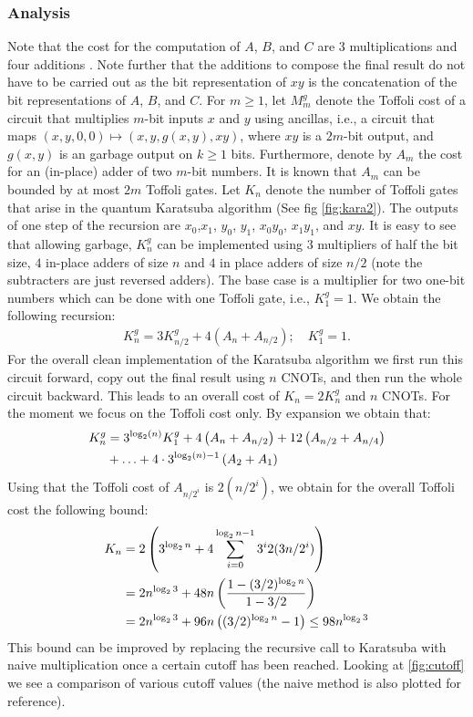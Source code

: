     \subsubsection{Analysis}
      Note that the cost for the computation of $A$, $B$, and $C$ are $3$ multiplications and four additions .
      Note further that the additions to compose the final result do not have to be carried out as the bit representation of $xy$ is the concatenation of the bit representations of $A$, $B$, and $C$.
      For $m\geq 1$, let $M^{g}_m$ denote the Toffoli cost of a circuit that multiplies $m$-bit inputs $x$ and $y$ using ancillas, i.e., a circuit that maps $(x, y, 0, 0) \mapsto (x, y, g(x,y), xy)$, where $xy$ is a $2m$-bit output, and $g(x,y)$ is an garbage output on $k\geq 1$ bits.
      Furthermore, denote by $A_m$ the cost for an (in-place) adder of two $m$-bit numbers.
      It is known that $A_m$ can be bounded by at most $2m$ Toffoli gates. Let $K_n$ denote the number of Toffoli gates that arise in the quantum Karatsuba algorithm (See fig \cref{fig:kara2}).
      The outputs of one step of the recursion are $x_0$,$x_1$, $y_0$, $y_1$, $x_0y_0$, $x_1 y_1$, and $xy$.
      It is easy to see that allowing garbage, $K_n^g$ can be implemented using $3$ multipliers of half the bit size, $4$ in-place adders of size $n$ and $4$ in place adders of size $n/2$ (note the subtracters are just reversed adders).
      The base case is a multiplier for two one-bit numbers which can be done with one Toffoli gate, i.e., $K_1^{g}=1$.
      We obtain the following recursion:
      \begin{align}
        K_n^{g} = 3 K_{n/2}^{g} + 4 \left(A_{n} + A_{n/2}\right); \quad K_1^{g}=1.
      \end{align}
      For the overall clean implementation of the Karatsuba algorithm we first run this circuit forward, copy out the final result using $n$ CNOTs, and then run the whole circuit backward.
      This leads to an overall cost of $K_n = 2 K_n^{g}$ and $n$ CNOTs.
      For the moment we focus on the Toffoli cost only.
      By expansion we obtain that:
      \begin{align}
        K_n^{g} &= 3^{\log_2(n)} K_1^{g} + 4\left( A_{n}+ A_{n/2} \right) + 12\left( A_{n/2}+ A_{n/4} \right)\notag\\
                & + \ldots + 4 \cdot 3^{\log_2(n)-1} \left(A_2 + A_1\right)
      \end{align}
      Using that the Toffoli cost of $A_{n/2^i}$ is $2(n/2^i)$, we obtain for the overall Toffoli cost the following bound:
      \begin{align}
        K_n &= 2\left(3^{\log_2 n } + 4 \sum_{i=0}^{\log_2 n - 1} 3^i 2(3n/2^i)\right)\notag\\
            &= 2n^{\log_2 3} + 48n \left(\frac{1- (3/2)^{\log_2 n}}{1-3/2}\right) \notag\\
            &= 2n^{\log_2 3} + 96n \left((3/2)^{\log_2{n}} -1\right) \leq 98 n^{\log_2{3}}
      \end{align}
      This bound can be improved by replacing the recursive call to Karatsuba with naive multiplication once a certain cutoff has been reached.
      Looking at \cref{fig:cutoff} we see a comparison of various cutoff values (the naive method is also plotted for reference).

